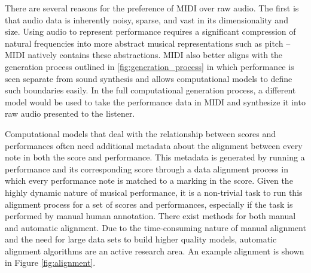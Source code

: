 There are several reasons for the preference of MIDI over raw audio. The first is that audio data is inherently noisy, sparse, and vast in its dimensionality and size. Using audio to represent performance requires a significant compression of natural frequencies into more abstract musical representations such as pitch -- MIDI natively contains these abstractions. MIDI also better aligns with the generation process outlined in \ref{fig:generation_process} in which performance is seen separate from sound synthesis and allows computational models to define such boundaries easily. In the full computational generation process, a different model would be used to take the performance data in MIDI and synthesize it into raw audio presented to the listener. 

Computational models that deal with the relationship between scores and performances often need additional metadata about the alignment between every note in both the score and performance. This metadata is generated by running a performance and its corresponding score through a data alignment process in which every performance note is matched to a marking in the score. Given the highly dynamic nature of musical performance, it is a non-trivial task to run this alignment process for a set of scores and performances, especially if the task is performed by manual human annotation. There exist methods for both manual and automatic alignment. Due to the time-consuming nature of manual alignment and the need for large data sets to build higher quality models, automatic alignment algorithms are an active research area. An example alignment is shown in Figure \ref{fig:alignment}.

